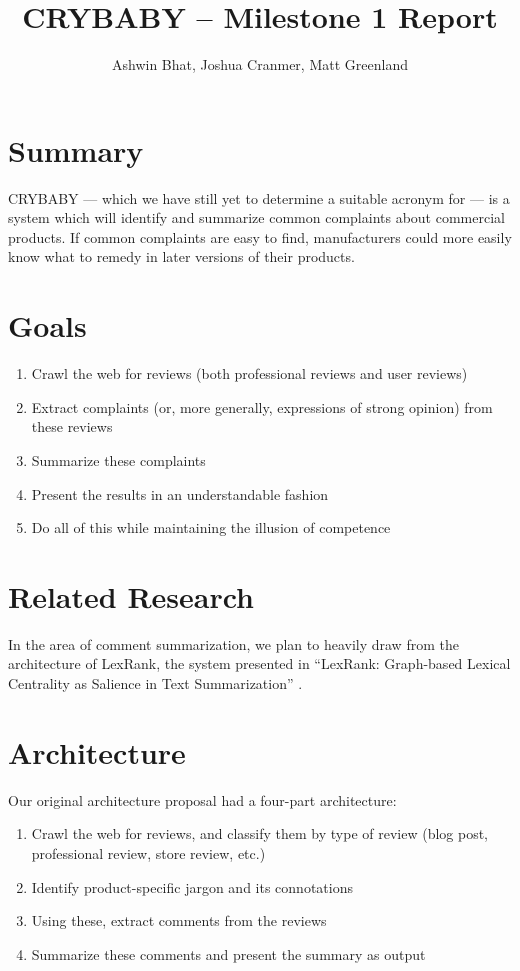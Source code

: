 \documentclass{article}
\title{CRYBABY -- Milestone 1 Report}
\author{Ashwin Bhat, Joshua Cranmer, Matt Greenland}
\begin{document}
\maketitle
\tableofcontents
\section{Summary}
CRYBABY --- which we have still yet to determine a suitable acronym for --- is a
system which will identify and summarize common complaints about commercial
products. If common complaints are easy to find, manufacturers could more
easily know what to remedy in later versions of their products.

\section{Goals}
\begin{enumerate}
\item Crawl the web for reviews (both professional reviews and user reviews)
\item Extract complaints (or, more generally, expressions of strong opinion)
from these reviews
\item Summarize these complaints
\item Present the results in an understandable fashion
\item Do all of this while maintaining the illusion of competence
\end{enumerate}

\section{Related Research}
In the area of comment summarization, we plan to heavily draw from the
architecture of LexRank, the system presented in ``LexRank: Graph-based
Lexical Centrality as Salience in Text Summarization'' \cite{lexrank}.

\section{Architecture}
Our original architecture proposal had a four-part architecture:
\begin{enumerate}
\item Crawl the web for reviews, and classify them by type of review
(blog post, professional review, store review, etc.)
\item Identify product-specific jargon and its connotations
\item Using these, extract comments from the reviews
\item Summarize these comments and present the summary as output
\end{enumerate}
\end{document}
